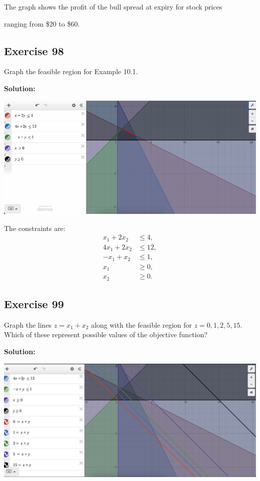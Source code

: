 \documentclass{article}
\begin{document}
The graph shows the profit of the bull spread at expiry for stock prices 

ranging from \$20 to \$60.

\subsection*{Exercise 98}
Graph the feasible region for Example 10.1.

\textbf{Solution:}
\begin{center}
    \includegraphics[width=1.2\textwidth]{Ex98.pdf}
\end{center}

The constraints are:
\[
\begin{aligned}
    x_1 + 2x_2 &\leq 4, \\
    4x_1 + 2x_2 &\leq 12, \\
    -x_1 + x_2 &\leq 1, \\
    x_1 &\geq 0, \\
    x_2 &\geq 0.
\end{aligned}
\]

\subsection*{Exercise 99}
Graph the lines \( z = x_1 + x_2 \) along with the feasible region for \( z = 0, 1, 2, 5, 15 \). Which of these represent possible values of the objective function?

\textbf{Solution:}

\begin{center}
    \includegraphics[width=1.2\textwidth]{Ex99.png}
\end{center}
\end{document}
